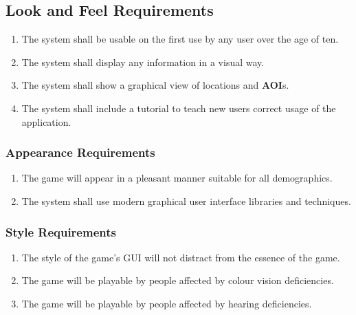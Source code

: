 \documentclass[titlepage]{article}
\newcounter{req}
\begin{document}
		
		\subsection{Look and Feel Requirements}
		\setcounter{req}{0}
		\label{sub:look_and_feel_requirements}
		\begin{enumerate}[{LF}1. ]
		\setcounter{enumi}{\value{req}}
			\item
			The system shall be usable on the first use by any user over the age of ten.
			\item
			The system shall display any information in a visual way. %
			\item
			The system shall show a graphical view of locations and \textbf{AOI}s.
			\item
			The system shall include a tutorial to teach new users correct usage of the application.
		\setcounter{req}{\theenumi}
		\end{enumerate}
		
		\subsubsection{Appearance Requirements}
		\label{ssub:appearance_requirements}
		\begin{enumerate}[{LF}1. ]
		\setcounter{enumi}{\value{req}}
			\item 
			The game will appear in a pleasant manner suitable for all demographics.
			\item
			The system shall use modern graphical user interface libraries and techniques.
		\setcounter{req}{\theenumi}
		\end{enumerate}
		
		\subsubsection{Style Requirements}
		\label{ssub:style_requirements}
		\begin{enumerate}[{LF}1. ]
		\setcounter{enumi}{\value{req}}
			\item 
			The style of the game's GUI will not distract from the essence of the game.
			\item
			The game will be playable by people affected by colour vision deficiencies.
			\item
			The game will be playable by people affected by hearing deficiencies.
		\setcounter{req}{\theenumi}
		\end{enumerate}
		
\end{document}
